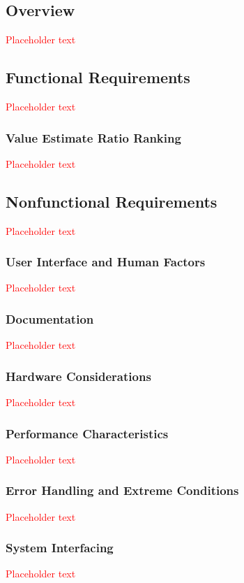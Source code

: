 \documentclass[a4paper, 11pt, titlepage]{article}
\begin{document}
\subsection{Overview}
\textcolor{red}{Placeholder text}

\subsection{Functional Requirements}
\textcolor{red}{Placeholder text}

\subsubsection{Value Estimate Ratio Ranking}
\textcolor{red}{Placeholder text}

\subsection{Nonfunctional Requirements}
\textcolor{red}{Placeholder text}

\subsubsection{User Interface and Human Factors}
\textcolor{red}{Placeholder text}

\subsubsection{Documentation}
\textcolor{red}{Placeholder text}

\subsubsection{Hardware Considerations}
\textcolor{red}{Placeholder text}

\subsubsection{Performance Characteristics}
\textcolor{red}{Placeholder text}

\subsubsection{Error Handling and Extreme Conditions}
\textcolor{red}{Placeholder text}

\subsubsection{System Interfacing}
\textcolor{red}{Placeholder text}
\end{document}
